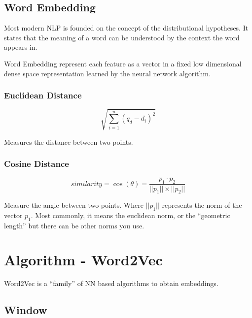 \documentclass[11pt]{article}
\begin{document}
\subsection{Word Embedding}

Most modern NLP is founded on the concept of the distributional hypotheses. It states that the meaning of a word can be understood by the context the word appears in. 

Word Embedding represent each feature as a vector in a fixed low dimensional dense space representation learned by the neural network algorithm.

\subsubsection{Euclidean Distance}

\begin{definition}
    \begin{equation*}
        \sqrt{\sum^n_{i=1}(q_d - d_i)^2}
    \end{equation*}    
\end{definition}

Measures the distance between two points.

\subsubsection{Cosine Distance}

\begin{definition}
    \begin{equation*}
        similarity = \cos(\theta) = \frac{p_1 \cdot p_2}{||p_1|| \times ||p_2||}    
    \end{equation*}
\end{definition}

Measure the angle between two points. Where $||p_1||$ represents the norm of the vector $p_1$. Most commonly, it means the euclidean norm, or the ``geometric length'' but there can be other norms you use.

\section{Algorithm - Word2Vec}

Word2Vec is a ``family'' of NN based algorithms to obtain embeddings. 

\subsection{Window}
\end{document}
